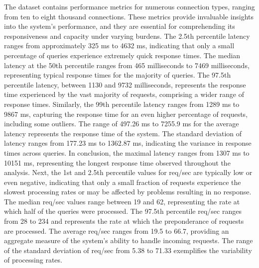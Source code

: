 \documentclass[../Main.tex]{subfiles}
\begin{document}
The dataset contains performance metrics for numerous connection types, ranging from ten to eight thousand connections. These metrics provide invaluable insights into the system's performance, and they are essential for comprehending its responsiveness and capacity under varying burdens. The 2.5th percentile latency ranges from approximately 325 ms to 4632 ms, indicating that only a small percentage of queries experience extremely quick response times. The median latency at the 50th percentile ranges from 465 milliseconds to 7469 milliseconds, representing typical response times for the majority of queries. The 97.5th percentile latency, between 1130 and 9732 milliseconds, represents the response time experienced by the vast majority of requests, comprising a wider range of response times. Similarly, the 99th percentile latency ranges from 1289 ms to 9867 ms, capturing the response time for an even higher percentage of requests, including some outliers. The range of 497.26 ms to 7255.9 ms for the average latency represents the response time of the system. The standard deviation of latency ranges from 177.23 ms to 1362.87 ms, indicating the variance in response times across queries. In conclusion, the maximal latency ranges from 1307 ms to 10151 ms, representing the longest response time observed throughout the analysis. Next, the 1st and 2.5th percentile values for req/sec are typically low or even negative, indicating that only a small fraction of requests experience the slowest processing rates or may be affected by problems resulting in no response. The median req/sec values range between 19 and 62, representing the rate at which half of the queries were processed. The 97.5th percentile req/sec ranges from 28 to 234 and represents the rate at which the preponderance of requests are processed. The average req/sec ranges from 19.5 to 66.7, providing an aggregate measure of the system's ability to handle incoming requests. The range of the standard deviation of req/sec from 5.38 to 71.33 exemplifies the variability of processing rates.\\
\end{document}
